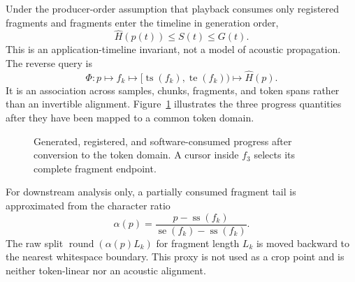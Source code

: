 Under the producer-order assumption that playback consumes only registered fragments and fragments enter the timeline in generation order,
\begin{equation}
\widehat H(p(t))\leq S(t)\leq G(t).
\label{eq:progress-order}
\end{equation}
This is an application-timeline invariant, not a model of acoustic propagation. The reverse query is
\begin{equation}
\Phi:p\mapsto f_k\mapsto
[\operatorname{ts}(f_k),\operatorname{te}(f_k))\mapsto\widehat H(p).
\label{eq:reverse-query}
\end{equation}
It is an association across samples, chunks, fragments, and token spans rather than an invertible alignment. Figure~\ref{fig:progress} illustrates the three progress quantities after they have been mapped to a common token domain.

\begin{figure}[t]
\centering
{}
\caption{Generated, registered, and software-consumed progress after conversion to the token domain. A cursor inside $f_3$ selects its complete fragment endpoint.}
\label{fig:progress}
\end{figure}

For downstream analysis only, a partially consumed fragment tail is approximated from the character ratio
\begin{equation}
\alpha(p)=\frac{p-\operatorname{ss}(f_k)}{\operatorname{se}(f_k)-\operatorname{ss}(f_k)}.
\label{eq:alpha}
\end{equation}
The raw split $\operatorname{round}(\alpha(p)L_k)$ for fragment length $L_k$ is moved backward to the nearest whitespace boundary. This proxy is not used as a crop point and is neither token-linear nor an acoustic alignment.

